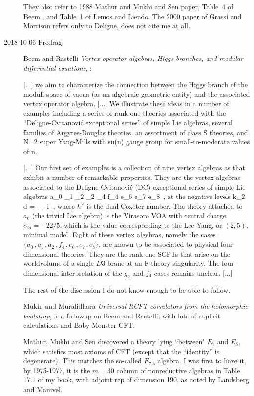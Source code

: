 \begin{description}
They also refer to {1988} Mathur and Mukhi and Sen paper,
Table~4 of Beem \etal{}, and Table~1 of Lemos and
Liendo. The 2000 paper of Grassi and Morrison
refers only to Deligne, does not cite me at all.

\item[2018-10-06 Predrag]
Beem and Rastelli
{\em Vertex operator algebras, {Higgs} branches, and modular differential equations},
:

[...] we aim to characterize the connection between the Higgs branch of the
moduli space of vacua (as an algebraic geometric entity) and the associated
vertex operator algebra.
[...] We illustrate these ideas in a number of examples including a series of
rank-one theories associated with the ``Deligne-Cvitanovi{\'c} exceptional series''
of simple Lie algebras, several families of Argyres-Douglas theories, an
assortment of class S theories, and N=2 super Yang-Mills with su(n) gauge group
for small-to-moderate values of n.

[...] Our first set of examples is a collection of nine vertex algebras as that
exhibit a number of remarkable properties. They are the vertex algebras
associated to the Deligne-Cvitanovi{\'c} (DC) exceptional series of simple Lie
algebras
\beq
{a}_0 _1 _2 _2 _4
\subset f_4 \subset e_6 \subset e_7 \subset e_8
\,,
at the negative levels
\beq k_{2 d} = -  - 1
\,,
where $h^\vee$ is the dual Coxeter number. The theory attached to ${a}_0$
(the trivial Lie algebra) is the Virasoro VOA with central charge
$c_{2d}=-22/5$, which is the value corresponding to the Lee-Yang, or $(2,5)$,
minimal model. Eight of these vertex algebras, namely the cases
$\{{a}_0\,,{a}_1\,,{a}_2\,,{f}_4\,,{e}_6\,,{e}_7\,,{e}_8\}$,
are known to be associated to physical four-dimensional theories. They are the
rank-one SCFTs that arise on the worldvolume of a single $D3$ brane at an
F-theory singularity. The four-dimensional interpretation of the ${g}_2$ and
${f}_4$ cases remains unclear.
[...]

The rest of the discussion I do not know enough to be able to follow.

Mukhi and Muralidhara
{\em Universal {RCFT} correlators from the holomorphic bootstrap},
 is a followup on Beem and Rastelli,
with lots of explicit calculations and Baby Monster CFT.

Mathur, Mukhi and Sen discovered a theory lying ``between" $E_7$ and
$E_8$, which satisfies most axioms of CFT (except that the ``identity'' is
degenerate). This matches the so-called $E_{7.5}$ algebra. I
was first to have it, by 1975-1977, it is the $m=30$ column of
nonreductive algebras in Table 17.1 of my book, with adjoint rep of
dimension 190, as noted by Landsberg and Manivel.


\end{description}
